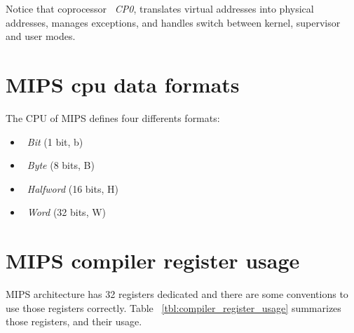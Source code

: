 \documentclass[
  oneside,
  11pt, a4paper,
  footinclude=true,
  headinclude=true,
  cleardoublepage=empty
]{scrbook}
\begin{document}
Notice that coprocessor ~\textit{CP0}, translates virtual addresses into physical addresses, manages exceptions, and handles switch between kernel, supervisor and user modes.

\section{MIPS cpu data formats}

The CPU of MIPS defines four differents formats:
\begin{itemize}
\item ~\textit{Bit} (1 bit, b)
\item ~\textit{Byte} (8 bits, B)
\item ~\textit{Halfword} (16 bits, H)
\item ~\textit{Word} (32 bits, W)
\end{itemize}




\section{MIPS compiler register usage}

MIPS architecture has 32 registers dedicated and there are some conventions to use those registers correctly.
Table ~\ref{tbl:compiler_register_usage} summarizes those registers, and their usage.
\end{document}
